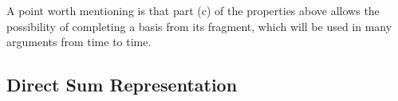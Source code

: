 A point worth mentioning is that part (c) of the properties above allows the possibility of completing a basis from its fragment, which will be used in many arguments from time to time.

\subsection{Direct Sum Representation}
\label{section:directsum}

